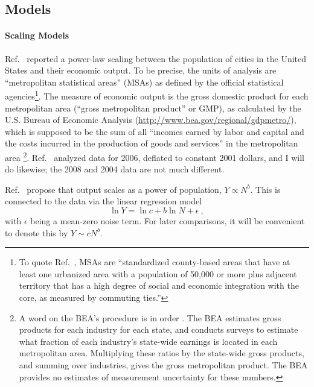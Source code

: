 \documentclass{pnastwo}
\begin{document}
\begin{article}
\section{Models}

\paragraph{Scaling Models} 
Ref.\ \cite{Bettencout-et-al-growth-innovation-scaling} reported a power-law
scaling between the population of cities in the United States and their
economic output.  To be precise, the units of analysis are ``metropolitan
statistical areas'' (MSAs) as defined by the official statistical
agencies\footnote{To quote Ref.\ \cite{McCormick-Panek-Rodriguez-gmp-for-2009},
  MSAs are ``standardized county-based areas that have at least one urbanized
  area with a population of 50,000 or more plus adjacent territory that has a
  high degree of social and economic integration with the core, as measured by
  commuting ties.''}.  The measure of economic output is the gross domestic
product for each metropolitan area (``gross metropolitan product'' or GMP), as
calculated by the U.S. Bureau of Economic Analysis
(\url{http://www.bea.gov/regional/gdpmetro/}), which is supposed to be the sum
of all ``incomes earned by labor and capital and the costs incurred in the
production of goods and services'' in the metropolitan area
\cite{Assenova-Broda-Taylor-gdp-by-state}\footnote{A word on the BEA's
  procedure is in order \cite{Panek-Baumgardner-McCormick-gdp-by-msa}. The BEA
  estimates gross products for each industry for each state, and conducts
  surveys to estimate what fraction of each industry's state-wide earnings is
  located in each metropolitan area.  Multiplying these ratios by the
  state-wide gross products, and summing over industries, gives the gross
  metropolitan product.  The BEA provides no estimates of measurement
  uncertainty for these numbers.}.  Ref.\
\cite{Bettencout-et-al-growth-innovation-scaling} analyzed data for 2006,
deflated to constant 2001 dollars, and I will do likewise; the 2008 and 2004
data are not much different.

Ref.\ \cite{Bettencout-et-al-growth-innovation-scaling} propose that output
scales as a power of population, $Y \propto N^b$.  This is connected to the
data via the linear regression model
\begin{equation}
\ln{Y} = \ln{c} + b\ln{N} + \epsilon ~,
\label{eqn:power-law-model}
\end{equation}
with $\epsilon$ being a mean-zero noise term.  For later comparisons, it will
be convenient to denote this by $Y \sim c N^b$.


\end{article}
\end{document}
